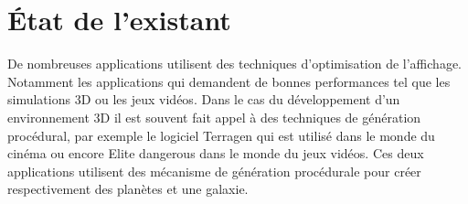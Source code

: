 \documentclass[12pt]{report}
\begin{document}
\newpage

\chapter*{État de l'existant}
\setcounter{chapter}{2}



De nombreuses applications utilisent des techniques d'optimisation de
l'affichage. Notamment les applications qui demandent de bonnes
performances tel que les simulations 3D ou les jeux vidéos.
Dans le cas du développement d'un environnement 3D il est souvent fait
appel à des techniques de génération procédural, par exemple le logiciel
Terragen qui est utilisé dans le monde du cinéma ou encore Elite
dangerous dans le monde du jeux vidéos.  Ces deux applications utilisent
des mécanisme de génération procédurale pour créer respectivement des
planètes et une galaxie.
\end{document}
